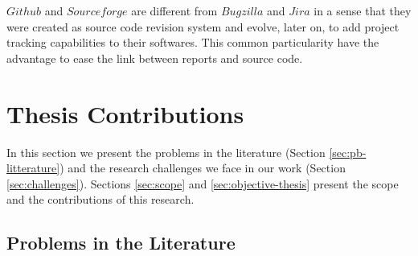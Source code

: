 $Github$ and $Sourceforge$ are different from $Bugzilla$ and $Jira$ in a sense that they were created as source code revision system and evolve, later on, to add project tracking capabilities to their softwares.
This common particularity have the advantage to ease the link between reports and source code.

\section{Thesis Contributions}

In this section we present the problems in the literature (Section \ref{sec:pb-litterature}) and the research challenges we face in our work (Section \ref{sec:challenges}). Sections \ref{sec:scope} and \ref{sec:objective-thesis} present the scope and the contributions of this research.

\subsection{Problems in the Literature\label{sec:pb-litterature}}

